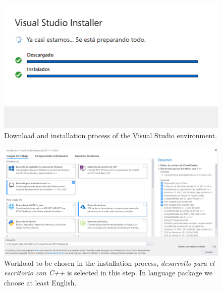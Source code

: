 \begin{figure}
    \centering
    \includegraphics[width= \textwidth]{Figures/Instalacion0}
    \caption{Download and installation process of the Visual Studio environment.}
    \label{fig:Instalacion0}
\end{figure}

\begin{figure}
    \centering
    \includegraphics[width= \textwidth]{Figures/Instalacion1}
    \caption{Workload to be chosen in the installation process, \textit{desarrollo para el escritorio con C++} is selected in this step. In language package we choose at least English.}
    \label{fig:Instalacion1}
\end{figure}

